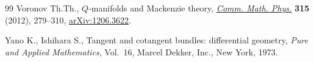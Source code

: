 \documentclass[pdftex]{sigma}
\numberwithin{equation}{section}
\begin{document}
\begin{thebibliography}{99}
Voronov Th.Th., {$Q$}-manifolds and {M}ackenzie theory, \href{http://dx.doi.org/10.1007/s00220-012-1568-y}{\textit{Comm. Math.
  Phys.}} \textbf{315} (2012), 279--310, \href{http://arxiv.org/abs/1206.3622}{arXiv:1206.3622}.

Yano K., Ishihara S., Tangent and cotangent bundles: dif\/ferential geometry,
  \textit{Pure and Applied Mathematics}, Vol.~16, Marcel Dekker, Inc., New
  York, 1973.

\end{thebibliography}\LastPageEnding
\end{document}
